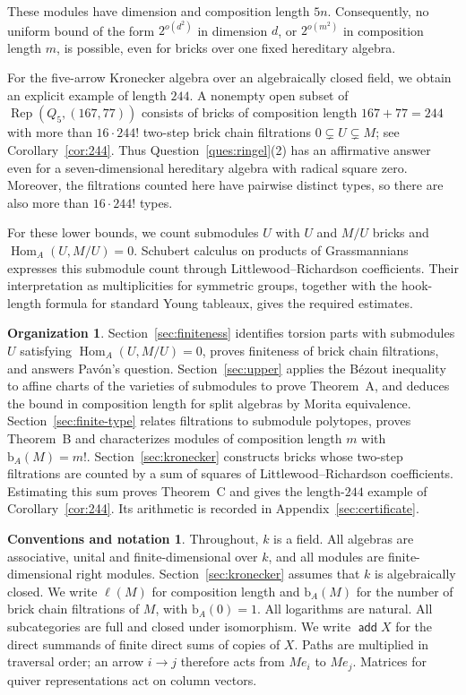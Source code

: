 \documentclass[a4paper,reqno,10pt]{amsart}
\theoremstyle{definition}
\newtheorem*{organization}{Organization}
\newtheorem*{conventions}{Conventions and notation}
\numberwithin{equation}{section}
\newcommand{\Hom}{\operatorname{Hom}}
\newcommand{\Rep}{\operatorname{Rep}}
\DeclareMathOperator{\add}{\mathsf{add}}
\newcommand{\bcount}{\mathrm b}
\begin{document}
These modules have dimension and composition length $5n$. Consequently,
no uniform bound of the form $2^{o(d^2)}$ in dimension $d$, or
$2^{o(m^2)}$ in composition length $m$, is possible, even for bricks
over one fixed hereditary algebra.

For the five-arrow Kronecker algebra over an algebraically closed field,
we obtain an explicit example of length $244$.
A nonempty open subset of
$\Rep(Q_5,(167,77))$ consists of bricks of
composition length $167+77=244$ with more than $16\cdot244!$ two-step
brick chain filtrations $0\subsetneq U\subsetneq M$; see
Corollary~\ref{cor:244}. Thus Question~\ref{ques:ringel}(2) has an
affirmative answer even for a seven-dimensional hereditary algebra with
radical square zero.
Moreover, the filtrations counted here
have pairwise distinct types, so there are also more than $16\cdot244!$
types.

For these lower bounds, we count submodules $U$ with $U$ and $M/U$
bricks and $\Hom_A(U,M/U)=0$.
Schubert calculus on products of Grassmannians expresses
this submodule count through
Littlewood--Richardson coefficients. Their interpretation as
multiplicities for symmetric groups, together with the hook-length
formula for standard Young tableaux, gives the required estimates.

\begin{organization}
Section~\ref{sec:finiteness} identifies torsion parts with submodules $U$
satisfying $\Hom_A(U,M/U)=0$, proves finiteness of brick chain
filtrations, and answers Pav\'on's question.
Section~\ref{sec:upper} applies the B\'ezout inequality to affine charts
of the varieties of submodules to prove Theorem~A, and deduces the bound in composition
length for split algebras by Morita equivalence.
Section~\ref{sec:finite-type} relates filtrations to submodule polytopes,
proves Theorem~B and characterizes modules of composition length $m$
with $\bcount_A(M)=m!$.
Section~\ref{sec:kronecker} constructs bricks whose two-step filtrations
are counted by a sum of squares of Littlewood--Richardson coefficients.
Estimating this sum proves Theorem~C and gives the length-$244$ example
of Corollary~\ref{cor:244}. Its arithmetic is recorded in
Appendix~\ref{sec:certificate}.
\end{organization}

\begin{conventions}
Throughout, $k$ is a field. All algebras are associative, unital and
finite-dimensional over $k$, and all modules are finite-dimensional
right modules. Section~\ref{sec:kronecker} assumes that $k$ is
algebraically closed.
We write $\ell(M)$ for composition length and $\bcount_A(M)$ for the
number of brick chain filtrations of $M$, with $\bcount_A(0)=1$.
All logarithms are natural.
All subcategories are full and closed under isomorphism.
We write $\add X$ for the direct summands of finite direct sums of
copies of $X$.
Paths are multiplied in traversal order; an arrow $i\to j$ therefore acts
from $Me_i$ to $Me_j$. Matrices for quiver representations act on column
vectors.
\end{conventions}
\end{document}
